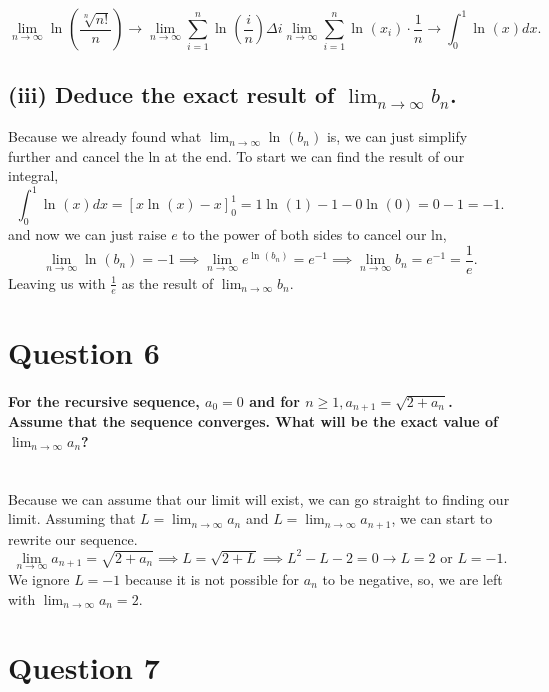 \[
\lim_{ n \to \infty} \ln^{  } \left( \frac{ \sqrt[ n ]{ n! }  }{ n } \right) \to \lim_{ n \to \infty} \sum_{ i=1 } ^{ n } \ln^{  } \left( \frac{ i }{ n }  \right) \Delta i
\lim_{ n \to \infty} \sum_{ i=1 } ^{ n } \ln^{  } \left( x_i \right) \cdot \frac{ 1 }{ n } \to \int_{ 0 }^{ 1 } \ln^{  } \left( x \right) dx
.\] 

\subsection*{(iii) Deduce the exact result of $ \lim_{ n \to \infty} b_n $.}%
Because we already found what $ \lim_{ n \to \infty} \ln^{  } \left( b_n \right)  $ is, we can just simplify further and cancel the ln at the end. To start we can find the result of our integral,
\[
\int_{ 0 }^{ 1 } \ln^{  } \left( x \right) dx = \left[ x\ln^{  } \left( x \right) -x \right] _{ 0 }^{ 1 } = 1\ln^{  } \left( 1 \right) -1-0\ln^{  } \left( 0 \right) = 0-1 = -1
.\] 
and now we can just raise $ e $ to the power of both sides to cancel our ln,
\[
\lim_{ n \to \infty} \ln^{  } \left( b_n \right) = -1 \implies \lim_{ n \to \infty} e^{ \ln^{  } \left( b_n \right)  }=e^{ -1 } \implies \lim_{ n \to \infty} b_n = e^{ -1 } = \frac{ 1 }{ e } 
.\] 
Leaving us with $ \frac{ 1 }{ e }  $ as the result of $ \lim_{ n \to \infty} b_n $.
\newpage
\section*{Question 6}%
\paragraph{For the recursive sequence, $ a_0 =0$ and for $ n\ge 1, a_{ n+1 }=\sqrt{ 2+ a_n} $. Assume that the sequence converges. What will be the exact value of $ \lim_{ n \to \infty} a_{ n } $? \\ \\ }
Because we can assume that our limit will exist, we can go straight to finding our limit. Assuming that $ L=\lim_{ n \to \infty} a_n $ and $ L=\lim_{ n \to \infty} a_{ n+1 } $, we can start to rewrite our sequence. 
\[
\lim_{ n \to \infty} a_{ n+1 } = \sqrt{ 2+a_n} \implies L = \sqrt{ 2+L } \implies L^2-L-2= 0 \to L=2 \text{ or } L=-1
.\] 
We ignore $ L=-1 $ because it is not possible for $ a_n $ to be negative, so, we are left with $ \lim_{ n \to \infty} a_n =2 $.

\section*{Question 7}%
